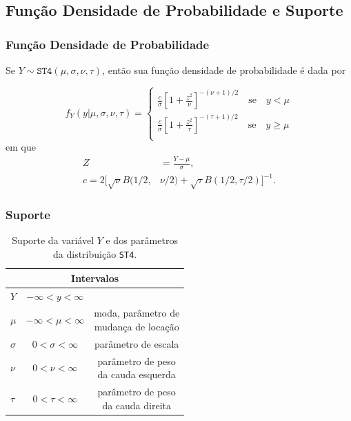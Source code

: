 \documentclass[13pt, aspectratio=169]{beamer}
\begin{document}
\subsection{Função Densidade de Probabilidade e Suporte}

\begin{frame}
    \frametitle{Função Densidade de Probabilidade}
    Se $Y \sim \texttt{ST4}(\mu, \sigma, \nu, \tau)$, então sua função densidade de probabilidade é dada por

    \begin{equation*}
        f_Y(y | \mu, \sigma, \nu, \tau) =
            \begin{cases}
                \frac{c}{\sigma} \left[ 1 + \frac{z^2}{\nu} \right]^{-(\nu + 1)/2} \quad \text{se} \quad y < \mu \\
                \frac{c}{\sigma} \left[ 1 + \frac{z^2}{\tau} \right]^{-(\tau + 1)/2} \quad \text{se} \quad y \geq \mu \\
            \end{cases}
    \end{equation*}
    \pause
    \qquad em que
    \begin{align*}
        Z &= \frac{Y - \mu}{\sigma}, \\
        c = 2 [\sqrt{\nu} B(1/2, &\nu/2) + \sqrt{\tau} B(1/2, \tau/2)]^{-1}.
    \end{align*}
\end{frame}

\begin{frame}
    \frametitle{Suporte}
    
    \begingroup
    \setlength{\tabcolsep}{12pt}
    \renewcommand{\arraystretch}{1.9}

    \begin{table}[!ht]
        \centering    
        \begin{tabular}{l c c}
            \multicolumn{3}{c}{Intervalos} \\
            \hline
            $Y$ & $- \infty < y < \infty$ &\\
            $\mu$ & $- \infty < \mu < \infty$ & \makecell{\scriptsize moda, parâmetro de \\[-0.3em] \scriptsize mudança de locação}\\
            $\sigma$ & $0 < \sigma < \infty$ & \scriptsize parâmetro de escala\\
            $\nu$ & $0 < \nu < \infty$ & \makecell{\scriptsize parâmetro de peso \\[-0.3em] \scriptsize da cauda esquerda} \\
            $\tau$ & $0 < \tau < \infty$ & \makecell{\scriptsize parâmetro de peso \\[-0.3em] \scriptsize da cauda direita} \\
        \hline
        \end{tabular}
        \caption{Suporte da variável $Y$ e dos parâmetros da distribuição \texttt{ST4}.}
    \end{table}

    \endgroup
\end{frame}
\end{document}
